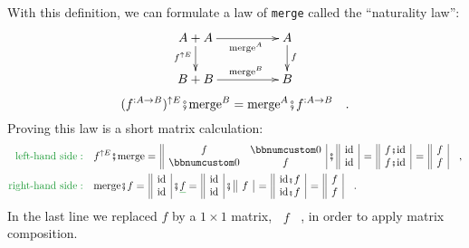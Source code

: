 With this definition, we can formulate a law of \lstinline!merge!
called the \textsf{``}naturality law\textsf{''}:
\[
\xymatrix{\xyScaleY{1.6pc}\xyScaleX{4.0pc}A+A\ar[d]\sb(0.45){f^{\uparrow E}}\ar[r]\sb(0.55){\text{merge}^{A}} & A\ar[d]\sp(0.45){f}\\
B+B\ar[r]\sp(0.55){\text{merge}^{B}} & B
}
\]
\[
(f^{:A\rightarrow B})^{\uparrow E}\bef\text{merge}^{B}=\text{merge}^{A}\bef f^{:A\rightarrow B}\quad.
\]
Proving this law is a short matrix calculation:
\begin{align*}
{\color{greenunder}\text{left-hand side}:}\quad & f^{\uparrow E}\bef\text{merge}=\,\begin{array}{||cc|}
f & \bbnum 0\\
\bbnum 0 & f
\end{array}\,\bef\,\begin{array}{||c|}
\text{id}\\
\text{id}
\end{array}\,=\,\begin{array}{||c|}
f\bef\text{id}\\
f\bef\text{id}
\end{array}\,=\,\begin{array}{||c|}
f\\
f
\end{array}\quad,\\
{\color{greenunder}\text{right-hand side}:}\quad & \text{merge}\bef f=\,\begin{array}{||c|}
\text{id}\\
\text{id}
\end{array}\,\bef\gunderline f=\,\begin{array}{||c|}
\text{id}\\
\text{id}
\end{array}\,\bef\,\begin{array}{||c|}
f\end{array}\,=\,\begin{array}{||c|}
\text{id}\bef f\\
\text{id}\bef f
\end{array}\,=\,\begin{array}{||c|}
f\\
f
\end{array}\quad.
\end{align*}
In the last line we replaced $f$ by a $1\times1$ matrix, $\,\begin{array}{||c|}
f\end{array}$~, in order to apply matrix composition.

